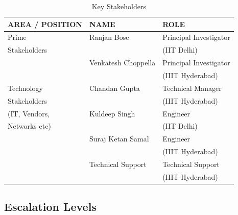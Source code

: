 \documentclass[11pt]{article}
\begin{document}
\begin{table}[H]
\caption{\label{tbl:Key Stakeholders}Key Stakeholders}
\begin{center}
\begin{tabular}{lll}
\hline
 AREA / POSITION  &  NAME                 &  ROLE                    \\
\hline
 Prime            &  Ranjan Bose          &  Principal Investigator  \\
 Stakeholders     &                       &  (IIT Delhi)             \\
                  &  Venkatesh Choppella  &  Principal Investigator  \\
                  &                       &  (IIIT Hyderabad)        \\
\hline
 Technology       &  Chandan Gupta        &  Technical Manager       \\
 Stakeholders     &                       &  (IIIT Hyderabad)        \\
 (IT, Vendors,    &  Kuldeep Singh        &  Engineer                \\
 Networks etc)    &                       &  (IIT Delhi)             \\
                  &  Suraj Ketan Samal    &  Engineer                \\
                  &                       &  (IIIT Hyderabad)        \\
                  &  Technical Support    &  Technical Support       \\
                  &                       &  (IIIT Hyderabad)        \\
\hline
\end{tabular}
\end{center}
\end{table}

\subsection{Escalation Levels}
\label{sec-5.2}
\end{document}
